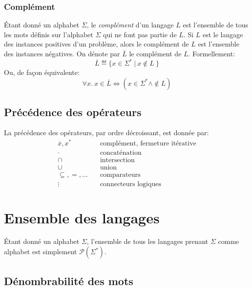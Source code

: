 \subsubsection{Complément}

Étant donné un alphabet $\Sigma$, le \og \textit{complément} \fg{} d'un langage $L$ est l'ensemble de tous les mots définis sur l'alphabet $\Sigma$ qui ne font pas partie de $L$. Si $L$ est le langage des instances positives d'un problème, alors le complément de $L$ est l'ensemble des instances négatives. On dénote par $\overline{L}$ le complément de $L$.
Formellement:
\[
\overline{L} \eqdef \{ x \in \Sigma^*\ |\ x \not\in L\ \}
\]
Ou, de façon équivalente:
\[
\forall x. \ x \in \overline{L} \iff (x \in \Sigma^* \wedge \not\in L)
\]

\subsection{Précédence des opérateurs}

La précédence des opérateurs, par ordre décroissant, est donnée par:
\begin{align*}
{\overline{x}}, x^* & \hspace{1em}\text{complément, fermeture itérative}\\
{\cdot} & \hspace{1em}\text{concaténation}\\
{\cap} & \hspace{1em}\text{intersection}\\
{\cup} & \hspace{1em}\text{union}\\
{\subseteq}, {=}, \dots & \hspace{1em}\text{comparateurs}\\
{\vdots} & \hspace{1em}\text{connecteurs logiques}
\end{align*}

\section{Ensemble des langages}

Étant donné un alphabet $\Sigma$, l'ensemble de tous les langages prenant $\Sigma$ comme alphabet est simplement $\mathcal{P}(\Sigma^*)$.

\subsection{Dénombrabilité des mots}


